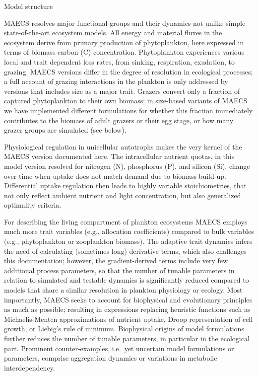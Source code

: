 \begin{section}{Model structure}

MAECS resolves major functional groups and their dynamics not unlike simple state-of-the-art ecosystem models. All energy and material fluxes in the ecosystem derive from primary production of phytoplankton, here expressed in terms of biomass carbon (C) concentration. Phytoplankton experiences various local and trait dependent loss rates, from sinking, respiration, exudation, to grazing. 
MAECS versions differ in the degree of resolution in ecological processes; a full account of grazing interactions in the plankton is only addressed by versions that includes size as a major trait. Grazers convert only a fraction of captured phytoplankton to their own biomass; in size-based variants of MAECS we have implemented different formulations for whether this fraction immediately contributes to the biomass of adult grazers or their egg stage, or how many grazer groups are simulated (see below).

Physiological regulation in unicellular autotrophs makes the very kernel of the MAECS version documented here. 
The intracellular nutrient quotas, in this model version resolved for nitrogen (N), phosphorus (P), and silicon (Si), change over time when uptake does not match demand due to biomass build-up. Differential uptake regulation then leads to highly variable stoichiometries, that not only reflect ambient nutrient and light concentration, but also generalized optimality criteria.

For describing the living compartment of plankton ecosystems MAECS employs much more trait variables (e.g., allocation coefficients) compared to bulk variables (e.g., phytoplankton or zooplankton biomass). The adaptive trait dynamics infers the need of calculating (sometimes long) derivative terms, which also challenges this documentation; however, the gradient-derived terms include very few  additional process parameters, so that the number of tunable parameters in relation to simulated and testable dynamics is significantly reduced compared to models that share a similar resolution in plankton physiology or ecology. Most importantly, MAECS seeks to account for biophysical and evolutionary principles as much as possible; resulting in expressions replacing heuristic functions such as Michaelis-Menten approximations of nutrient uptake, Droop representation of cell growth, or Liebig's rule of minimum. Biophysical origins of model formulations further reduces the number of tunable parameters, in particular in the ecological part. Prominent counter-examples, i.e.~yet uncertain model formulations or parameters, comprise aggregation dynamics or variations in metabolic interdependency. 



\end{section}
